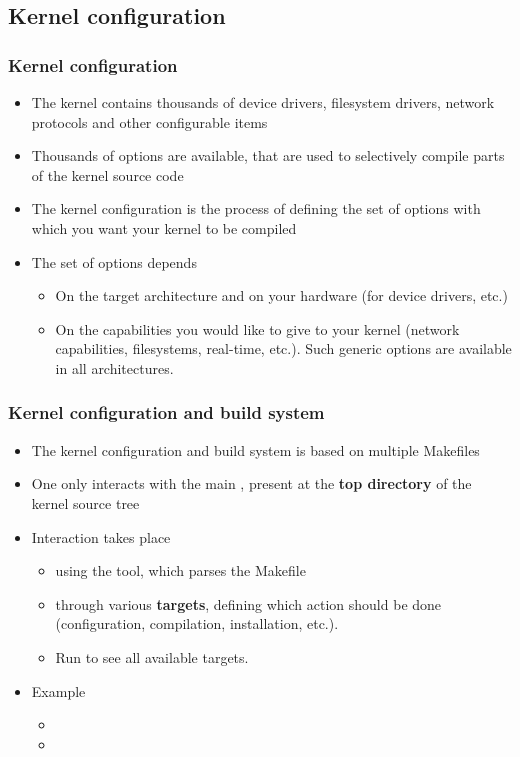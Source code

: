 \subsection{Kernel configuration}

\begin{frame}
  \frametitle{Kernel configuration}
  \begin{itemize}
  \item The kernel contains thousands of device drivers, filesystem
    drivers, network protocols and other configurable items
  \item Thousands of options are available, that are used to
    selectively compile parts of the kernel source code
  \item The kernel configuration is the process of defining the set of
    options with which you want your kernel to be compiled
  \item The set of options depends
    \begin{itemize}
    \item On the target architecture and on your hardware (for device drivers, etc.)
    \item On the capabilities you would like to give to your kernel
      (network capabilities, filesystems, real-time, etc.).
      Such generic options are available in all architectures.
    \end{itemize}
  \end{itemize}
\end{frame}

\begin{frame}
  \frametitle{Kernel configuration and build system}
  \begin{itemize}
  \item The kernel configuration and build system is based on multiple
    Makefiles
  \item One only interacts with the main , present at
    the {\bf top directory} of the kernel source tree
  \item Interaction takes place
    \begin{itemize}
    \item using the  tool, which parses the Makefile
    \item through various {\bf targets}, defining which action should
      be done (configuration, compilation, installation, etc.).
    \item Run  to see all available targets.
    \end{itemize}
  \item Example
    \begin{itemize}
    \item {}
    \item {}
    \end{itemize}
  \end{itemize}
\end{frame}

